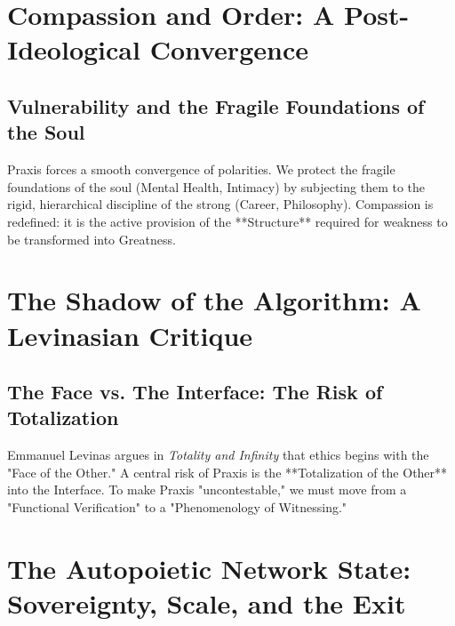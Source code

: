 \documentclass[12pt,a4paper,oneside]{report}
\begin{document}
\chapter{Compassion and Order: A Post-Ideological Convergence}

\section{Vulnerability and the Fragile Foundations of the Soul}
Praxis forces a smooth convergence of polarities. We protect the fragile foundations of the soul (Mental Health, Intimacy) by subjecting them to the rigid, hierarchical discipline of the strong (Career, Philosophy). Compassion is redefined: it is the active provision of the **Structure** required for weakness to be transformed into Greatness.

\chapter{The Shadow of the Algorithm: A Levinasian Critique}

\section{The Face vs. The Interface: The Risk of Totalization}
Emmanuel Levinas argues in \textit{Totality and Infinity} that ethics begins with the "Face of the Other." A central risk of Praxis is the **Totalization of the Other** into the Interface. To make Praxis "uncontestable," we must move from a "Functional Verification" to a "Phenomenology of Witnessing." 

\chapter{The Autopoietic Network State: Sovereignty, Scale, and the Exit}

\end{document}

